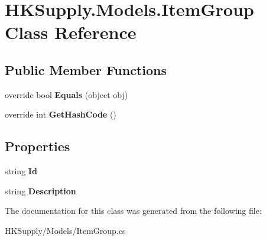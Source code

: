 \hypertarget{class_h_k_supply_1_1_models_1_1_item_group}{}\section{H\+K\+Supply.\+Models.\+Item\+Group Class Reference}
\label{class_h_k_supply_1_1_models_1_1_item_group}
\subsection*{Public Member Functions}
\begin{DoxyCompactItemize}
\item 
\mbox{\label{class_h_k_supply_1_1_models_1_1_item_group_a6764026db4309a28ede6271a9ba7117c}} 
override bool {\bfseries Equals} (object obj)
\item 
\mbox{\label{class_h_k_supply_1_1_models_1_1_item_group_a83ec8e5111570e8f44d3ed24a879c5d4}} 
override int {\bfseries Get\+Hash\+Code} ()
\end{DoxyCompactItemize}
\subsection*{Properties}
\begin{DoxyCompactItemize}
\item 
\mbox{\label{class_h_k_supply_1_1_models_1_1_item_group_a974d63c65bbaa586fb6e1a29554d9209}} 
string {\bfseries Id}
\item 
\mbox{\label{class_h_k_supply_1_1_models_1_1_item_group_a7015f2aea50fe78999e75bf7afee6145}} 
string {\bfseries Description}
\end{DoxyCompactItemize}


The documentation for this class was generated from the following file\+:\begin{DoxyCompactItemize}
\item 
H\+K\+Supply/\+Models/Item\+Group.\+cs\end{DoxyCompactItemize}
